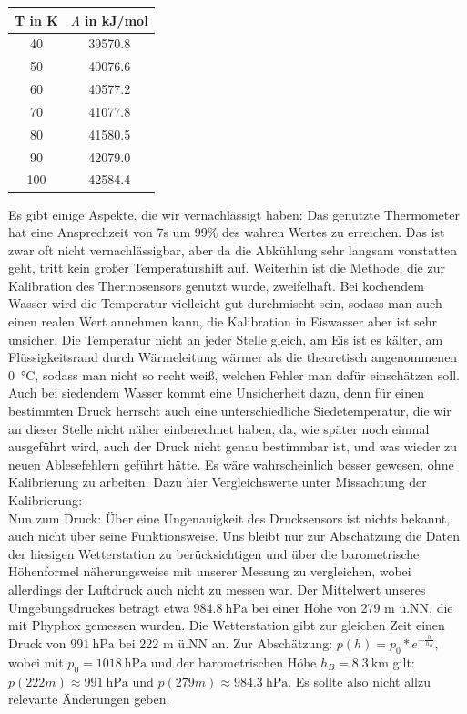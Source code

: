\documentclass[]{article}
\begin{document}
\begin{center}

	\begin{tabular}{|c|c|}
		\hline
		T in K & $\Lambda$ in kJ/mol\\
		\hline
		\hline
		40 & 39570.8 \\
		\hline
		50 & 40076.6 \\
		\hline
		60 & 40577.2 \\
		\hline
		70 & 41077.8 \\
		\hline
		80 & 41580.5 \\
		\hline
		90 & 42079.0 \\
		\hline
		100 & 42584.4 \\
		\hline  
	\end{tabular} 
\end{center}
Es gibt einige Aspekte, die wir vernachlässigt haben:
Das genutzte Thermometer hat eine Ansprechzeit von 7s um $99\%$ des wahren Wertes zu erreichen. Das ist zwar oft nicht vernachlässigbar, aber da die Abkühlung sehr langsam vonstatten geht, tritt kein großer Temperaturshift auf.
Weiterhin ist die Methode, die zur Kalibration des Thermosensors genutzt wurde, zweifelhaft. Bei kochendem Wasser wird die Temperatur vielleicht gut durchmischt sein, sodass man auch einen realen Wert annehmen kann, die Kalibration in Eiswasser aber ist sehr unsicher. Die Temperatur nicht an jeder Stelle gleich, am Eis ist es kälter, am Flüssigkeitsrand durch Wärmeleitung wärmer als die theoretisch angenommenen \SI{0}{\celsius}, sodass man nicht so recht weiß, welchen Fehler man dafür einschätzen soll. Auch bei siedendem Wasser kommt eine Unsicherheit dazu, denn für einen bestimmten Druck herrscht auch eine unterschiedliche Siedetemperatur, die wir an dieser Stelle nicht näher einberechnet haben, da, wie später noch einmal ausgeführt wird, auch der Druck nicht genau bestimmbar ist, und was wieder zu neuen Ablesefehlern geführt hätte.
Es wäre wahrscheinlich besser gewesen, ohne Kalibrierung zu arbeiten. {\color{red}Dazu hier Vergleichswerte unter Missachtung der Kalibrierung}:\\
Nun zum Druck: Über eine Ungenauigkeit des Drucksensors ist nichts bekannt, auch nicht über seine Funktionsweise. Uns bleibt nur zur Abschätzung die Daten der hiesigen Wetterstation zu berücksichtigen und über die barometrische Höhenformel näherungsweise mit unserer Messung zu vergleichen, wobei allerdings der Luftdruck auch nicht zu messen war. Der Mittelwert unseres Umgebungsdruckes beträgt etwa $\SI{984.8}{\hecto \pascal}$ bei einer Höhe von 279 m ü.NN, die mit Phyphox gemessen wurden. Die Wetterstation gibt zur gleichen Zeit einen Druck von $\SI{991}{\hecto \pascal}$ bei 222 m ü.NN an. Zur Abschätzung: $p(h)=p_0*e^{-\frac{h}{h_B}}$, wobei mit $p_0=\SI{1018}{\hecto \pascal}$ und der barometrischen Höhe $h_B=\SI{8.3}{\kilo \meter}$ gilt: $p(222m) \approx \SI{991}{\hecto \pascal}$ und $p(279m) \approx \SI{984.3}{\hecto \pascal}$. Es sollte also nicht allzu relevante Änderungen geben.\\
\end{document}
